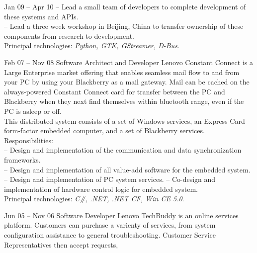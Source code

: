 \documentclass[letterpaper, 11pt]{article}
\begin{document}
\begin{resume}
\begin{block}
\begin{subcategory}{Jan 09 -- Apr 10}
                -- Lead a small team of developers to complete development of these systems and APIs. \\
                -- Lead a three week workshop in Beijing, China to transfer ownership of these components from research to development.
                \\[1ex]
                Principal technologies: \emph{Python, GTK, GStreamer, D-Bus}.
                \bigskip
            \end{subcategory}
            \begin{subcategory}{Feb 07 -- Nov 08}
                 {Software Architect and Developer}
                Lenovo Constant Connect is a Large Enterprise market offering that enables
                seamless mail flow to and from your PC by using your Blackberry as a mail
                gateway.  Mail can be cached on the always-powered Constant Connect card for
                transfer between the PC and Blackberry when they next find themselves within
                bluetooth range, even if the PC is asleep or off.
                \\[1ex]
                This distributed system consists of a set of Windows services, an Express Card
                form-factor embedded computer, and a set of Blackberry services.
                \\[1ex]
                Responsibilities: \\
                -- Design and implementation of the communication and data synchronization frameworks. \\
                -- Design and implementation of all value-add software for the embedded system. \\
                -- Design and implementation of PC system services.
                -- Co-design and implementation of hardware control logic for embedded system.
                \\[1ex]
                Principal technologies: \emph{C\#, .NET, .NET CF, Win CE 5.0}.
                \bigskip
            \end{subcategory}
            \begin{subcategory}{Jun 05 -- Nov 06}
                 {Software Developer}
                Lenovo TechBuddy is an online services platform.  Customers can purchase
                a varienty of services, from system configuration assistance to general
                troubleshooting.  Customer Service Representatives then accept requests,

\end{subcategory}
\end{block}
\end{resume}
\end{document}
